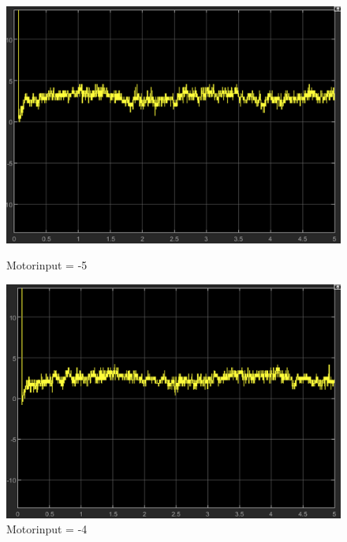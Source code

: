 \documentclass{article}
\begin{document}
\begin{figure}[h]
  \centering
  \begin{minipage}[b]{0.4\textwidth}
    \includegraphics[width=\textwidth]{-5.png}
    \caption{Motorinput = -5}
  \end{minipage}
  \hfill
  \begin{minipage}[b]{0.4\textwidth}
    \includegraphics[width=\textwidth]{-4.png}
    \caption{Motorinput = -4}
  \end{minipage}
\end{figure}


\vspace{5mm}
\end{document}
